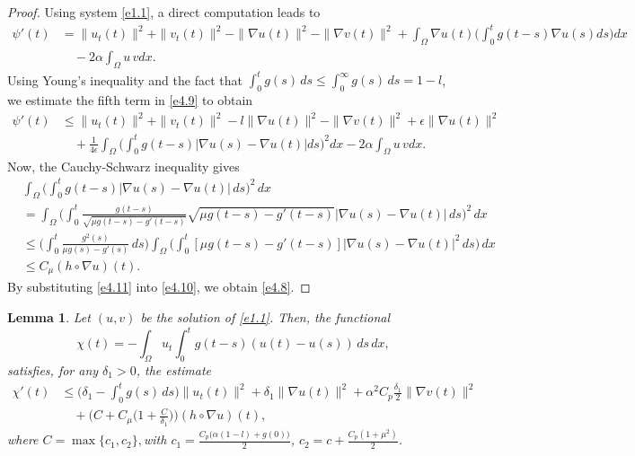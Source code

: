 \documentclass[11pt]{article}
\numberwithin{equation}{section}
\newtheorem{lemma}[theorem]{Lemma}
\begin{document}
\begin{proof}
Using system \eqref{e1.1}, a direct computation leads to
\begin{equation}
\begin{aligned}
 \psi'(t) &= \| u_t(t) \|^2 + \| v_t(t) \|^2 -\| \nabla u(t) \|^2
  -\| \nabla v(t) \|^2 + \int_{\Omega} \nabla u(t)
  \Big( \int_0^t g(t - s) \nabla u(s) ds \Big) dx \\
&\quad - 2 \alpha\int_{\Omega} u \, v dx.
\end{aligned} \label{e4.9}
\end{equation}
Using Young's inequality and the fact that
$\int_0^t g(s) \, ds \leq \int_0^{\infty} g(s) \, ds = 1 - l$, we
estimate the fifth term in \eqref{e4.9} to  obtain
\begin{equation}
\begin{aligned}
 \psi'(t) &\leq \| u_t(t) \|^2 + \| v_t(t) \|^2 - l \| \nabla u(t)\|^2
 -\| \nabla v(t) \|^2 + \epsilon \| \nabla u(t) \|^2\\
&\quad +\frac{1}{4\epsilon} \int_{\Omega}
 \Big( \int_0^t g(t - s) |\nabla u(s) - \nabla u(t)| ds \Big)^2 dx
 - 2 \alpha\int_{\Omega} u \, v dx.
\end{aligned}\label{e4.10}
\end{equation}
 Now, the  Cauchy-Schwarz inequality gives
\begin{equation}
\begin{aligned}
&\int_{\Omega} \Big( \int_0^{t} g(t - s) |\nabla u(s) - \nabla u(t)| \, ds \Big)^2
 \, dx \\
&=\int_{\Omega} \Big(\int_0^{t} \frac{g(t - s)}{\sqrt{\mu g(t - s)
 - g'(t - s)}} \sqrt{\mu g(t - s) - g'(t - s)} |\nabla u(s) - \nabla u(t)| \, ds \Big)^2
   \, dx\\
&\leq \Big( \int_0^{t} \frac{g^2(s)}{\mu g(s) - g'(s)} \, ds \Big)
 \int_{\Omega} \Big( \int_0^{t} [\mu g(t - s) - g'(t - s)] |\nabla u(s)
 - \nabla u(t)|^2 \, ds \Big) \, dx \\
&\leq C_\mu (h \circ \nabla u)(t).
\end{aligned} \label{e4.11}
\end{equation}
By substituting \eqref{e4.11} into \eqref{e4.10}, we obtain \eqref{e4.8}.
\end{proof}

\begin{lemma}  \label{lem8}
Let $(u, v)$ be the solution of \eqref{e1.1}. Then, the functional
\[
 \chi(t) = -\int_{\Omega} u_t \int_0^t g(t - s)(u(t) - u(s)) \, ds \, dx,
\]
satisfies, for any $ \delta_{1} > 0$, the estimate
\begin{equation}
\begin{aligned}
 \chi'(t) &\leq  \Big(\delta_{1} - \int_0^t g(s) \, ds \Big) \| u_t (t)\|^2
  + \delta_{1} \| \nabla u (t) \|^2
  +\alpha^2 C_p \frac{\delta_{1}}{2} \| \nabla v (t)\|^2 \\
&\quad +\Big(C+ C_\mu \Big( 1+ \frac{C}{ \delta_{1}}\Big) \Big)
 (h \circ \nabla u)(t),
\end{aligned} \label{e4.12}
\end{equation}
 where $C=\max\{c_1,c_2\},$\quad with $c_1=\frac{C_{p}\big(\alpha(1-l)+g(0)\big)}{2}$,
 $c_2= c+\frac{C_{p}(1+\mu^2)}{2}$.
\end{lemma}
\end{document}
